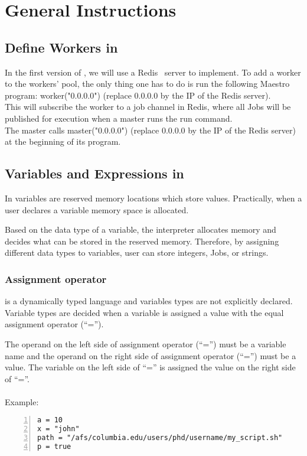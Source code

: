 \section{General Instructions}
\label{sect:general}

\subsection*{Define Workers in \lang{}}
In the first version of \lang{}, we will use a Redis~\cite{redis} server to
implement. To add a worker to the workers' pool, the only thing one has to do
is run the following Maestro program: worker("0.0.0.0") (replace 0.0.0.0 by
the IP of the Redis server).\\
This will subscribe the worker to a job channel in Redis, where all Jobs will
be published for execution when a master runs the run command.\\
The master calls master("0.0.0.0") (replace 0.0.0.0 by the IP of the Redis server)
at the beginning of its program.

\subsection*{Variables and Expressions in \lang{}}
In \lang{} variables are reserved memory locations which store values.
Practically, when a user declares a variable memory space is allocated.

Based on the data type of a variable, the interpreter allocates memory
and decides what can be stored in the reserved memory. Therefore, by
assigning different data types to variables, user can store integers, Jobs,
or strings.

\subsubsection*{Assignment operator}
\lang{}  is a dynamically typed language and variables types are not explicitly declared.
Variable types are decided when a variable is assigned a value with the equal
assignment operator (``='').

The operand on the left side of assignment operator (``='') must be a variable name
and the operand on the right side of assignment operator (``='') must be a value.
The variable on the left side of ``='' is assigned the value on the right side
of ``=''.\\
\\
Example:
\begin{Verbatim}[numbers=left]
a = 10
x = "john"
path = "/afs/columbia.edu/users/phd/username/my_script.sh"
p = true
\end{Verbatim}

